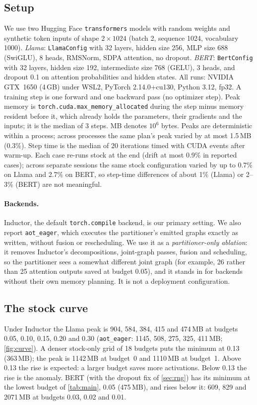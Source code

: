 \documentclass[10pt]{article}
\newcommand{\code}[1]{\texttt{#1}}
\begin{document}
\subsection{Setup}
\label{sec:setup}
We use two Hugging Face \code{transformers} models with random weights and synthetic token inputs of shape
$2\times1024$ (batch 2, sequence 1024, vocabulary 1000).
\emph{Llama}: \code{LlamaConfig} with 32 layers, hidden size 256, MLP size 688 (SwiGLU), 8 heads, RMSNorm, SDPA attention,
no dropout.
\emph{BERT}: \code{BertConfig} with 32 layers, hidden size 192, intermediate size 768 (GELU), 3 heads, and dropout 0.1 on
attention probabilities and hidden states.
All runs: NVIDIA GTX~1650 (4\,GB) under WSL2, PyTorch 2.14.0+cu130, Python 3.12, fp32.
A training step is one forward and one backward pass (no optimizer step). Peak memory is
\code{torch.cuda.max\_memory\_allocated} during the step minus memory resident before it, which already holds the
parameters, their gradients and the inputs; it is the median of 3 steps. MB denotes $10^6$ bytes.
Peaks are deterministic within a process; across processes the same plan's peak varied by at most 1.5\,MB (0.3\%).
Step time is the median of 20 iterations timed with CUDA events after warm-up. Each case re-runs stock at the end
(drift at most 0.9\% in reported cases); across separate sessions the same stock configuration varied by up to 0.7\% on
Llama and 2.7\% on BERT, so step-time differences of about 1\% (Llama) or 2--3\% (BERT) are not meaningful.

\paragraph{Backends.} Inductor, the default \code{torch.compile} backend, is our primary setting. We also report
\code{aot\_eager}, which executes the partitioner's emitted graphs exactly as written, without fusion or rescheduling.
We use it as a \emph{partitioner-only ablation}: it removes Inductor's decompositions, joint-graph passes, fusion and
scheduling, so the partitioner sees a somewhat different joint graph (for example, 26 rather than 25 attention outputs
saved at budget 0.05), and it stands in for backends without their own memory planning. It is not a deployment configuration.

\subsection{The stock curve}
\label{sec:curve}
Under Inductor the Llama peak is 904, 584, 384, 415 and 474\,MB at budgets 0.05, 0.10, 0.15, 0.20 and 0.30
(\code{aot\_eager}: 1145, 508, 275, 325, 411\,MB; \cref{fig:curve}).
A denser stock-only grid of 18 budgets puts the minimum at 0.13 (363\,MB); the peak is 1142\,MB at budget~0 and
1110\,MB at budget~1. Above 0.13 the rise is expected: a larger budget saves more activations. Below 0.13 the rise is
the anomaly. BERT (with the dropout fix of \cref{sec:rng}) has its minimum at the lowest budget of \cref{tab:main}, 0.05
(475\,MB), and rises below it: 609, 829 and 2071\,MB at budgets 0.03, 0.02 and 0.01.
\end{document}
